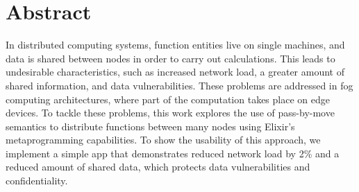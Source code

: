 
\chapter{Abstract}

In distributed computing systems, function entities live on single machines, and data is shared between nodes in order to 
carry out calculations. This leads to undesirable characteristics,
such as increased network load, a greater amount of shared information, and data vulnerabilities. These problems are addressed in fog computing architectures, where part of the computation takes place on edge devices. To tackle these problems, this work explores the use of pass-by-move semantics to distribute functions between many nodes using Elixir's metaprogramming capabilities. To show the usability of this approach, we implement a simple app that demonstrates reduced network load by 2\% and a reduced amount of shared data, which protects data vulnerabilities and confidentiality.


\endinput

